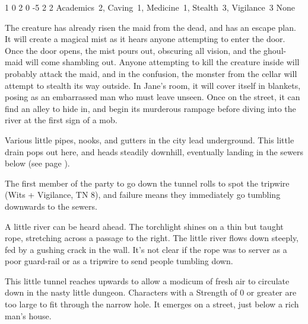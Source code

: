 \begin{multicols}{2}

	{1}%
	{0}%
	{{2}%
	{0}%
	{-5}}%
	{2}%
	{2}%
	{Academics~2, Caving~1, Medicine~1, Stealth~3, Vigilance~3
	}%
	{None}%
	{}

The creature has already risen the maid from the dead, and has an escape plan.
It will create a magical mist as it hears anyone attempting to enter the door.
Once the door opens, the mist pours out, obscuring all vision, and the ghoul-maid will come shambling out.
Anyone attempting to kill the creature inside will probably attack the maid, and in the confusion, the monster from the cellar will attempt to stealth its way outside.
In Jane's room, it will cover itself in blankets, posing as an embarrassed man who must leave unseen.
Once on the street, it can find an alley to hide in, and begin its murderous rampage before diving into the river at the first sign of a mob.


\label{runoff}

Various little pipes, nooks, and gutters in the city lead underground.
This little drain pops out here, and heads steadily downhill, eventually landing in the sewers below (see page \pageref{slidein}).

The first member of the party to go down the tunnel rolls to spot the tripwire (Wits + Vigilance, TN 8), and failure means they immediately go tumbling downwards to the sewers.

\begin{boxtext}

	A little river can be heard ahead.
	The torchlight shines on a thin but taught rope, stretching across a passage to the right.
	The little river flows down steeply, fed by a gushing crack in the wall.
	It's not clear if the rope was to server as a poor guard-rail or as a tripwire to send people tumbling down.

\end{boxtext}


This little tunnel reaches upwards to allow a modicum of fresh air to circulate down in the nasty little dungeon.  Characters with a Strength of 0 or greater are too large to fit through the narrow hole.  It emerges on a street, just below a rich man's house.


\end{multicols}
